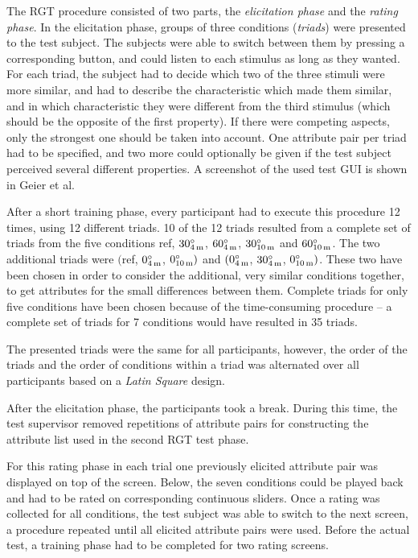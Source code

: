 The \ac{RGT} procedure consisted of two parts, the \emph{elicitation phase} and
the \emph{rating phase}. In the elicitation phase, groups of three conditions
(\emph{triads}) were presented to the test subject. The subjects were able to
switch between them by pressing a corresponding button, and could listen to each
stimulus as long as they wanted.  For each triad, the subject had to decide
which two of the three stimuli were more similar, and had to describe the
characteristic which made them similar, and in which characteristic they were
different from the third stimulus (which should be the opposite of the first
property).  If there were competing aspects, only the strongest one should be
taken into account.  One attribute pair per triad had to be specified, and two
more could optionally be given if the test subject perceived several different
properties. A screenshot of the used test GUI is shown in Geier et
al.\autocite{Geier2010a}

After a short training phase, every participant had to execute this procedure 12
times, using 12 different triads.  10 of the 12 triads resulted from a complete
set of triads from the five conditions ref, $30^\circ_{4\,\text{m}}$,
$60^\circ_{4\,\text{m}}$, $30^\circ_{10\,\text{m}}$ and
$60^\circ_{10\,\text{m}}$.  The
two additional triads were $($ref, $0^\circ_{4\,\text{m}}$,
$0^\circ_{10\,\text{m}})$
and $(0^\circ_{4\,\text{m}}$, $30^\circ_{4\,\text{m}}$,
$0^\circ_{10\,\text{m}})$.  These
two have been chosen in order to consider the additional, very similar
conditions together, to get attributes for the small differences between them.
Complete triads for only five conditions have been chosen because of the
time-consuming procedure -- a complete set of triads for 7 conditions would have
resulted in 35 triads.

The presented triads were the same for all participants, however, the order of
the triads and the order of conditions within a triad was alternated over all
participants based on a \emph{Latin Square} design.

After the elicitation phase, the participants took a break. During this time,
the test supervisor removed repetitions of attribute pairs for constructing the
attribute list used in the second \ac{RGT} test phase.

For this rating phase in each trial one previously elicited attribute pair was
displayed on top of the screen. Below, the seven conditions could be played back
and had to be rated on corresponding continuous sliders.
Once a rating was collected for
all conditions, the test subject was able to switch to the next screen, a
procedure repeated until all elicited attribute pairs were used.  Before the
actual test, a training phase had to be completed for two rating screens.

